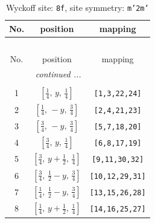 \documentclass[fleqn,8pt]{jsarticle}
\begin{document}
\begin{longtable}{ccc}
\caption{Wyckoff site: {\tt 8f}, site symmetry: {\tt m'2m'}}
 \\
 \hline \hline
No. & position & mapping \\ \hline \endfirsthead

\multicolumn{2}{l}{\tablename\ \thetable{}} \\
 \hline \hline
No. & position & mapping \\ \hline \endhead

 \hline \hline
\multicolumn{2}{r}{\footnotesize\it continued ...} \\ \endfoot

 \hline \hline
\multicolumn{2}{r}{} \\ \endlastfoot

1 & $\left[ \frac{1}{4},\, y,\, \frac{1}{4} \right]$ & {\tt [1,3,22,24]} \\ \hline
2 & $\left[ \frac{1}{4},\, - y,\, \frac{3}{4} \right]$ & {\tt [2,4,21,23]} \\ \hline
3 & $\left[ \frac{3}{4},\, - y,\, \frac{3}{4} \right]$ & {\tt [5,7,18,20]} \\ \hline
4 & $\left[ \frac{3}{4},\, y,\, \frac{1}{4} \right]$ & {\tt [6,8,17,19]} \\ \hline
5 & $\left[ \frac{3}{4},\, y + \frac{1}{2},\, \frac{1}{4} \right]$ & {\tt [9,11,30,32]} \\ \hline
6 & $\left[ \frac{3}{4},\, \frac{1}{2} - y,\, \frac{3}{4} \right]$ & {\tt [10,12,29,31]} \\ \hline
7 & $\left[ \frac{1}{4},\, \frac{1}{2} - y,\, \frac{3}{4} \right]$ & {\tt [13,15,26,28]} \\ \hline
8 & $\left[ \frac{1}{4},\, y + \frac{1}{2},\, \frac{1}{4} \right]$ & {\tt [14,16,25,27]} \\
\end{longtable}
\renewcommand{\arraystretch}{1.2}
\end{document}
